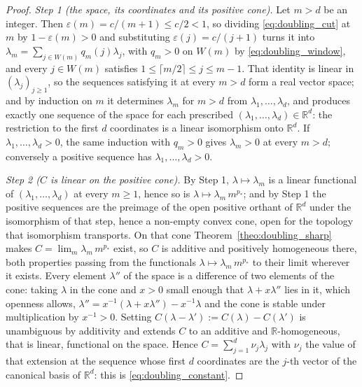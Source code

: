 \begin{proof}
\emph{Step 1 (the space, its coordinates and its positive cone).} Let $m>d$ be an integer. Then
$\varepsilon(m)=c/(m+1)\leq c/2<1$, so dividing \eqref{eq:doubling_cut} at $m$ by
$1-\varepsilon(m)>0$ and substituting $\varepsilon(j)=c/(j+1)$ turns it into
$\lambda_m=\sum_{j\in W(m)}q_m(j)\lambda_j$, with $q_m>0$ on $W(m)$ by
\eqref{eq:doubling_window}, and every $j\in W(m)$ satisfies $1\leq\lceil m/2\rceil\leq j\leq
m-1$. That identity is linear in $(\lambda_j)_{j\geq1}$, so the sequences satisfying it at
every $m>d$ form a real vector space; and by induction on $m$ it determines $\lambda_m$ for
$m>d$ from $\lambda_1,\dots,\lambda_d$, and produces exactly one sequence of the space for each
prescribed $(\lambda_1,\dots,\lambda_d)\in\mathbb R^{d}$: the restriction to the first $d$
coordinates is a linear isomorphism onto $\mathbb R^{d}$. If $\lambda_1,\dots,\lambda_d>0$, the
same induction with $q_m>0$ gives $\lambda_m>0$ at every $m>d$; conversely a positive sequence
has $\lambda_1,\dots,\lambda_d>0$.

\emph{Step 2 ($C$ is linear on the positive cone).} By Step 1, $\lambda\mapsto\lambda_m$ is a
linear functional of $(\lambda_1,\dots,\lambda_d)$ at every $m\geq1$, hence so is
$\lambda\mapsto\lambda_m\,m^{p_*}$; and by Step 1 the positive sequences are the preimage of
the open positive orthant of $\mathbb R^{d}$ under the isomorphism of that step, hence a
non-empty convex cone, open for the topology that isomorphism transports. On that cone
Theorem~\ref{theo:doubling_sharp} makes $C=\lim_m\lambda_m\,m^{p_*}$ exist, so $C$ is additive
and positively homogeneous there, both properties passing from the functionals
$\lambda\mapsto\lambda_m\,m^{p_*}$ to their limit wherever it exists. Every element
$\lambda''$ of the space is a difference of two elements of the cone: taking $\lambda$ in the
cone and $x>0$ small enough that $\lambda+x\lambda''$ lies in it, which openness allows,
$\lambda''=x^{-1}(\lambda+x\lambda'')-x^{-1}\lambda$ and the cone is stable under
multiplication by $x^{-1}>0$. Setting $C(\lambda-\lambda'):=C(\lambda)-C(\lambda')$ is
unambiguous by additivity and extends $C$ to an additive and $\mathbb R$-homogeneous, that is
linear, functional on the space. Hence
$C=\sum_{j=1}^{d}\nu_j\lambda_j$ with $\nu_j$ the value of that extension at the sequence whose
first $d$ coordinates are the $j$-th vector of the canonical basis of $\mathbb R^{d}$: this is
\eqref{eq:doubling_constant}.


\end{proof}
